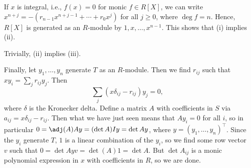 If $x$ is integral, i.e., $f(x) = 0$ for monic $f \in R[X]$, we can write
$x^{n+j} = -(r_{n-1}x^{n+j-1} + \cdots + r_0x^j)$ for all $j\geq 0$, where
$\deg f = n$. Hence, $R[X]$ is generated as an $R$-module by
$1, x, \ldots, x^{n-1}$. This shows that (i) implies (ii).

Trivially, (ii) implies (iii).

Finally, let $y_1, \ldots, y_n$ generate $T$ as an $R$-module. Then we find
$r_{ij}$ such that $xy_i = \sum_j r_{ij}y_j$. Then
\[ \sum_j (x\delta_{ij}-r_{ij})y_j = 0, \]
where $\delta$ is the Kronecker delta. Define a matrix $A$ with coefficients in
$S$ via $a_{ij} = x\delta_{ij} - r_{ij}$. Then what we have just seen means that
$Ay_i = 0$ for all $i$, so in particular $0 = \adj(A)Ay = (\det A)Iy= \det A y$,
where $y = (y_1, \ldots, y_n)^\top$. Since the $y_i$ generate $T$, $1$ is a linear
combination of the $y_i$, so we find some row vector $v$ such that
$0 = \det A yv = \det(A) 1 = \det A$. But $\det A_{ij}$ is a monic polynomial
expression in $x$ with coefficients in $R$, so we are done.
